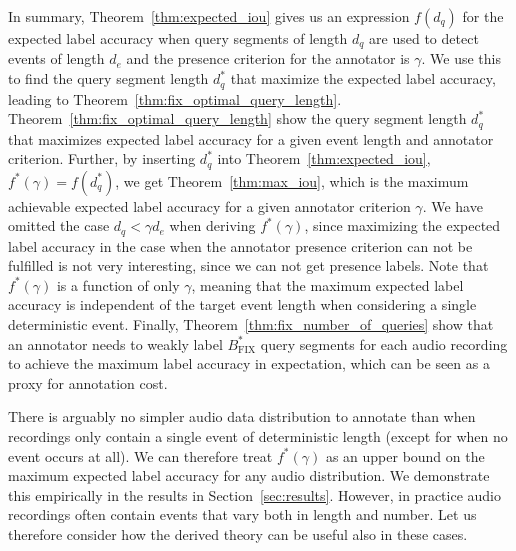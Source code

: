 
In summary, Theorem~\ref{thm:expected_iou} gives us an expression $f(d_q)$ for the expected label accuracy when query segments of length $d_q$ are used to detect events of length $d_e$ and the presence criterion for the annotator is $\gamma$. We use this to find the query segment length $d_q^*$ that maximize the expected label accuracy, leading to Theorem~\ref{thm:fix_optimal_query_length}. Theorem~\ref{thm:fix_optimal_query_length} show the query segment length $d_q^*$ that maximizes expected label accuracy for a given event length and annotator criterion. Further, by inserting $d_q^*$ into Theorem~\ref{thm:expected_iou}, $f^*(\gamma) = f(d_q^*)$, we get Theorem~\ref{thm:max_iou}, which is the maximum achievable expected label accuracy for a given annotator criterion $\gamma$. We have omitted the case $d_q < \gamma d_e$ when deriving $f^*(\gamma)$, since maximizing the expected label accuracy in the case when the annotator presence criterion can not be fulfilled is not very interesting, since we can not get presence labels. Note that $f^*(\gamma)$ is a function of only $\gamma$, meaning that the maximum expected label accuracy is independent of the target event length when considering a single deterministic event. Finally, Theorem~\ref{thm:fix_number_of_queries} show that an annotator needs to weakly label $B^*_{\text{FIX}}$ query segments for each audio recording to achieve the maximum label accuracy in expectation, which can be seen as a proxy for annotation cost.

There is arguably no simpler audio data distribution to annotate than when recordings only contain a single event of deterministic length (except for when no event occurs at all). We can therefore treat $f^*(\gamma)$ as an upper bound on the maximum expected label accuracy for any audio distribution. We demonstrate this empirically in the results in Section~\ref{sec:results}. However, in practice audio recordings often contain events that vary both in length and number. Let us therefore consider how the derived theory can be useful also in these cases.



